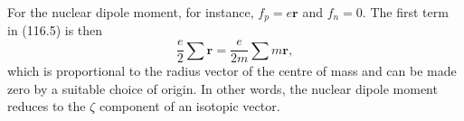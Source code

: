 For the nuclear dipole moment, for instance, $f_p=e\mathbf r$ and $f_n=0$. The first term in (116.5) is then
\[
 \frac e2\sum\mathbf r=\frac{e}{2m}\sum m\mathbf r,
\]
which is proportional to the radius vector of the centre of mass and can be made zero by a suitable choice of origin. In other words, the nuclear dipole moment reduces to the $\zeta$ component of an isotopic vector.
